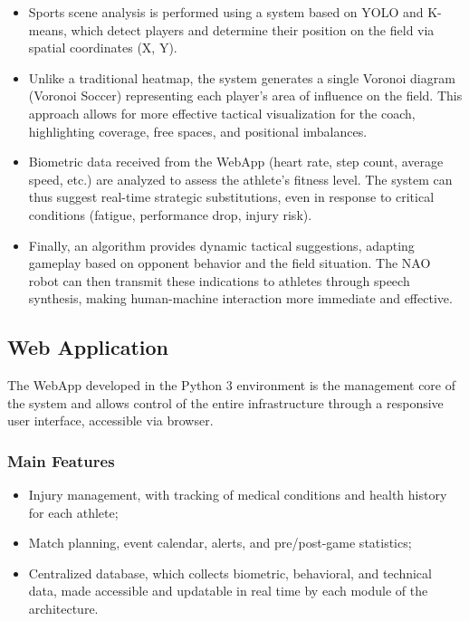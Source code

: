 \documentclass{optica-article}
\begin{document}
\begin{itemize}
  \item Sports scene analysis is performed using a system based on YOLO and K-means, which detect players and determine their position on the field via spatial coordinates (X, Y).
  
  \item Unlike a traditional heatmap, the system generates a single Voronoi diagram (Voronoi Soccer) representing each player’s area of influence on the field. This approach allows for more effective tactical visualization for the coach, highlighting coverage, free spaces, and positional imbalances.
  
  \item Biometric data received from the WebApp (heart rate, step count, average speed, etc.) are analyzed to assess the athlete's fitness level. The system can thus suggest real-time strategic substitutions, even in response to critical conditions (fatigue, performance drop, injury risk).
  
  \item Finally, an algorithm provides dynamic tactical suggestions, adapting gameplay based on opponent behavior and the field situation. The NAO robot can then transmit these indications to athletes through speech synthesis, making human-machine interaction more immediate and effective.
\end{itemize}

\subsection{Web Application}
The WebApp developed in the Python 3 environment is the management core of the system and allows control of the entire infrastructure through a responsive user interface, accessible via browser.

\subsubsection*{Main Features}
\begin{itemize}
  \item Injury management, with tracking of medical conditions and health history for each athlete;
  \item Match planning, event calendar, alerts, and pre/post-game statistics;
  \item Centralized database, which collects biometric, behavioral, and technical data, made accessible and updatable in real time by each module of the architecture.
\end{itemize}
\end{document}
